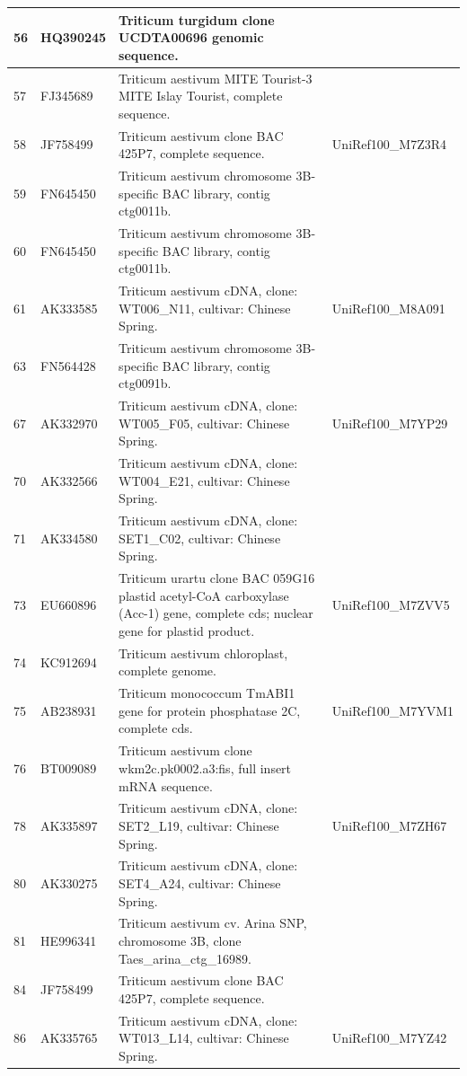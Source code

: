 \documentclass[10.9pt]{article} %
\begin{document}
{\begin{longtable}{|p{1.5cm}|p{2cm}|p{9cm}|p{3cm}|}
\hline
56 & HQ390245 & Triticum turgidum clone UCDTA00696 genomic sequence. & \\
\hline
57 & FJ345689 & Triticum aestivum MITE Tourist-3 MITE Islay Tourist, complete sequence. & \\
\hline
58 & JF758499 & Triticum aestivum clone BAC 425P7, complete sequence. & UniRef100\_M7Z3R4\\
\hline
59 & FN645450 & Triticum aestivum chromosome 3B-specific BAC library, contig ctg0011b. & \\
\hline
60 & FN645450 & Triticum aestivum chromosome 3B-specific BAC library, contig ctg0011b. & \\
\hline
61 & AK333585 & Triticum aestivum cDNA, clone: WT006\_N11, cultivar: Chinese Spring. & UniRef100\_M8A091\\
\hline
63 & FN564428 & Triticum aestivum chromosome 3B-specific BAC library, contig ctg0091b. & \\
\hline
67 & AK332970 & Triticum aestivum cDNA, clone: WT005\_F05, cultivar: Chinese Spring. & UniRef100\_M7YP29\\
\hline
70 & AK332566 & Triticum aestivum cDNA, clone: WT004\_E21, cultivar: Chinese Spring. & \\
\hline
71 & AK334580 & Triticum aestivum cDNA, clone: SET1\_C02, cultivar: Chinese Spring. & \\
\hline
73 & EU660896 & Triticum urartu clone BAC 059G16 plastid acetyl-CoA carboxylase (Acc-1) gene, complete cds; nuclear gene for plastid product. & UniRef100\_M7ZVV5\\
\hline
74 & KC912694 & Triticum aestivum chloroplast, complete genome. & \\
\hline
75 & AB238931 & Triticum monococcum TmABI1 gene for protein phosphatase 2C, complete cds. & UniRef100\_M7YVM1\\
\hline
76 & BT009089 & Triticum aestivum clone wkm2c.pk0002.a3:fis, full insert mRNA sequence. & \\
\hline
78 & AK335897 & Triticum aestivum cDNA, clone: SET2\_L19, cultivar: Chinese Spring. & UniRef100\_M7ZH67\\
\hline
80 & AK330275 & Triticum aestivum cDNA, clone: SET4\_A24, cultivar: Chinese Spring. & \\
\hline
81 & HE996341 & Triticum aestivum cv. Arina SNP, chromosome 3B, clone Taes\_arina\_ctg\_16989. & \\
\hline
84 & JF758499 & Triticum aestivum clone BAC 425P7, complete sequence. & \\
\hline
86 & AK335765 & Triticum aestivum cDNA, clone: WT013\_L14, cultivar: Chinese Spring. & UniRef100\_M7YZ42\\

\end{longtable}}
\end{document}
